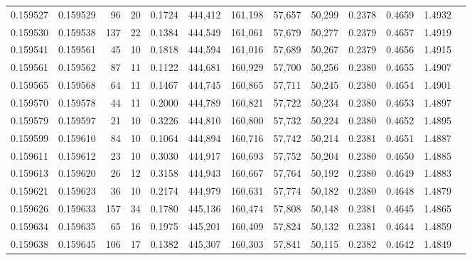 \begin{tabular}{rrrrrrrrrrrrr}
0.159527 & 0.159529 &    96 &  20 &                                     0.1724 & 444,412 & 161,198 &  57,657 &  50,299 & 0.2378 & 0.4659 & 1.4932 \\
0.159530 & 0.159538 &   137 &  22 &                                     0.1384 & 444,549 & 161,061 &  57,679 &  50,277 & 0.2379 & 0.4657 & 1.4919 \\
0.159541 & 0.159561 &    45 &  10 &                                     0.1818 & 444,594 & 161,016 &  57,689 &  50,267 & 0.2379 & 0.4656 & 1.4915 \\
0.159561 & 0.159562 &    87 &  11 &                                     0.1122 & 444,681 & 160,929 &  57,700 &  50,256 & 0.2380 & 0.4655 & 1.4907 \\
0.159565 & 0.159568 &    64 &  11 &                                     0.1467 & 444,745 & 160,865 &  57,711 &  50,245 & 0.2380 & 0.4654 & 1.4901 \\
0.159570 & 0.159578 &    44 &  11 &                                     0.2000 & 444,789 & 160,821 &  57,722 &  50,234 & 0.2380 & 0.4653 & 1.4897 \\
0.159579 & 0.159597 &    21 &  10 &                                     0.3226 & 444,810 & 160,800 &  57,732 &  50,224 & 0.2380 & 0.4652 & 1.4895 \\
0.159599 & 0.159610 &    84 &  10 &                                     0.1064 & 444,894 & 160,716 &  57,742 &  50,214 & 0.2381 & 0.4651 & 1.4887 \\
0.159611 & 0.159612 &    23 &  10 &                                     0.3030 & 444,917 & 160,693 &  57,752 &  50,204 & 0.2380 & 0.4650 & 1.4885 \\
0.159613 & 0.159620 &    26 &  12 &                                     0.3158 & 444,943 & 160,667 &  57,764 &  50,192 & 0.2380 & 0.4649 & 1.4883 \\
0.159621 & 0.159623 &    36 &  10 &                                     0.2174 & 444,979 & 160,631 &  57,774 &  50,182 & 0.2380 & 0.4648 & 1.4879 \\
0.159626 & 0.159633 &   157 &  34 &                                     0.1780 & 445,136 & 160,474 &  57,808 &  50,148 & 0.2381 & 0.4645 & 1.4865 \\
0.159634 & 0.159635 &    65 &  16 &                                     0.1975 & 445,201 & 160,409 &  57,824 &  50,132 & 0.2381 & 0.4644 & 1.4859 \\
0.159638 & 0.159645 &   106 &  17 &                                     0.1382 & 445,307 & 160,303 &  57,841 &  50,115 & 0.2382 & 0.4642 & 1.4849 \\

\end{tabular}
